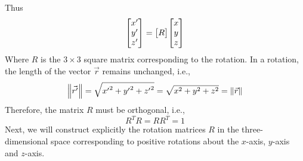Thus
\begin{equation}
\label{chapter18.eqn1}
\mqty[x^\prime\\ y^\prime \\ z^\prime] = \mqty[R]  \mqty[x\\ y \\ z]
\end{equation}
Where $R$ is the $3\times3$ square matrix corresponding to the rotation. In a rotation, the length of the vector $\vec{r}$ remains unchanged, i.e.,
\begin{equation}
\norm{\vec{r^\prime}} = \sqrt{{x^{\prime}}^2 + {y^{\prime}}^2 + {z^{\prime}}^2} = \sqrt{x^2 + y^2 + z^2} =\norm{\vec{r}}
\end{equation}
Therefore, the matrix $R$ must be orthogonal, i.e.,
\begin{equation}
R^T R = R R^T = \mathcal{1}
\end{equation}
Next, we will construct explicitly the rotation matrices $R$ in the three-dimensional space corresponding to positive rotations about the $x$-axis, $y$-axis and $z$-axis.

